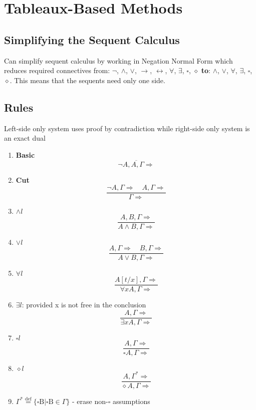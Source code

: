 \documentclass{article}
\begin{document}
\section{Tableaux-Based Methods}
\subsection{Simplifying the Sequent Calculus}
Can simplify sequent calculus by working in Negation Normal Form which reduces required connectives from: $\neg$, $\wedge$, $\vee$, $\rightarrow$, $\leftrightarrow$, $\forall$, $\exists$, $\square$, $\diamond$ \textbf{to}: $\wedge$, $\vee$, $\forall$, $\exists$, $\square$, $\diamond$. This means that the sequents need only one side.

\subsection{Rules}
Left-side only system uses proof by contradiction while right-side only system is an exact dual
\begin{enumerate}
    \item \textbf{Basic}
    $$\overline{\neg A, A, \Gamma \Rightarrow}$$
    
    \item \textbf{Cut}
    $$\frac{\neg A, \Gamma \Rightarrow \quad A, \Gamma \Rightarrow}{\Gamma \Rightarrow}$$
    
    \item \textbf{$\wedge l$}
    $$\frac{A, B, \Gamma \Rightarrow}{A \wedge B, \Gamma \Rightarrow}$$
    
    \item \textbf{$\vee l$}
    $$\frac{A, \Gamma \Rightarrow \quad B, \Gamma \Rightarrow}{A \vee B, \Gamma \Rightarrow}$$
    
    \item \textbf{$\forall l$}
    $$\frac{A[t / x], \Gamma \Rightarrow}{\forall x A, \Gamma \Rightarrow}$$
    
    \item \textbf{$\exists l$}: provided x is not free in the conclusion
    $$\frac{A, \Gamma \Rightarrow}{\exists x A, \Gamma \Rightarrow}$$
    
    \item \textbf{$\square l$}
    $$ \frac{A, \Gamma \Rightarrow}{\square A, \Gamma \Rightarrow}$$
    
    \item \textbf{$\diamond l$}
    $$\frac{A, \Gamma^{*} \Rightarrow}{\diamond A, \Gamma \Rightarrow}$$
    
    \item $\Gamma^{*} \stackrel{\mathrm{def}}{=}\{\square \mathrm{B} | \square \mathrm{B} \in \Gamma\}$ - erase non-$\square$ assumptions
\end{enumerate}
\end{document}
